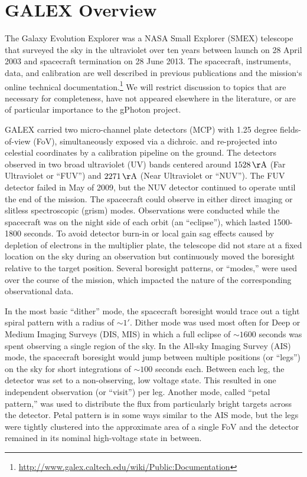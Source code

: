 \documentclass[trackchanges,preprint2]{aastex}
\begin{document}
\section{GALEX Overview}
The Galaxy Evolution Explorer \citep{mar2005} was a NASA Small Explorer (SMEX) telescope that surveyed the sky in the ultraviolet over ten years between launch on 28 April 2003 and spacecraft termination on 28 June 2013. The spacecraft, instruments, data, and calibration are well described in previous publications \citep{mor2005,mor2007} and the mission`s online technical documentation.\footnote{\url{http://www.galex.caltech.edu/wiki/Public:Documentation}} We will restrict discussion to topics that are necessary for completeness, have not appeared elsewhere in the literature, or are of particular importance to the gPhoton project.

GALEX carried two micro-channel plate detectors (MCP) with 1.25 degree fields-of-view (FoV), simultaneously exposed via a dichroic.  and re-projected into celestial coordinates by a calibration pipeline on the ground. The detectors observed in two broad ultraviolet (UV) bands centered around $1528\,\rm{\AA}$ (Far Ultraviolet or ``FUV'') and $2271\,\rm{\AA}$ (Near Ultraviolet or ``NUV''). The FUV detector failed in May of 2009, but the NUV detector continued to operate until the end of the mission. The spacecraft could observe in either direct imaging or slitless spectroscopic (grism) modes. Observations were conducted while the spacecraft was on the night side of each orbit (an ``eclipse''), which lasted 1500-1800 seconds. To avoid detector burn-in or local gain sag effects caused by depletion of electrons in the multiplier plate, the telescope did not stare at a fixed location on the sky during an observation but continuously moved the boresight relative to the target position. Several boresight patterns, or ``modes,'' were used over the course of the mission, which impacted the nature of the corresponding observational data.

In the most basic ``dither'' mode, the spacecraft boresight would trace out a tight spiral pattern with a radius of $\sim1'$. Dither mode was used most often for Deep or Medium Imaging Surveys (DIS, MIS) in which a full eclipse of $\sim1600$ seconds was spent observing a single region of the sky. In the All-sky Imaging Survey (AIS) mode, the spacecraft boresight would jump between multiple positions (or ``legs'') on the sky for short integrations of $\sim100$ seconds each. Between each leg, the detector was set to a non-observing, low voltage state. This resulted in one independent observation (or ``visit'') per leg. Another mode, called ``petal pattern,'' was used to distribute the flux from particularly bright targets across the detector. Petal pattern is in some ways similar to the AIS mode, but the legs were tightly clustered into the approximate area of a single FoV and the detector remained in its nominal high-voltage state in between.
\end{document}
